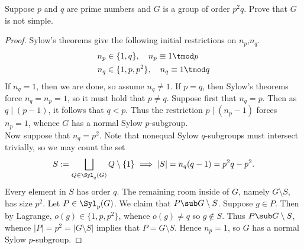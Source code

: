 \documentclass[12pt]{article}
\begin{document}
\begin{homeworkProblem}
  Suppose $p$ and $q$ are prime numbers and $G$ is a group of order $p^2q$. Prove that $G$ is not simple.

\begin{proof}
  Sylow's theorems give the following initial restrictions on $ n_{p} $,$ n_{q} $.
  \begin{align*}
      n_{p} &\in \{1,q\}, \quad n_{p} \equiv 1\tmod p\\
      n_{q} &\in \{1,p,p^{2}\},\quad n_{q} \equiv  1\tmod q\\
    \end{align*}
    If $ n_{q}=1 $, then we are done, so assume $ n_{q}\neq 1 $. If $ p=q $, then Sylow's theorems force $ n_{q}=n_{p}=1 $, so it must hold that $ p\neq q $. Suppose first that $ n_{q} = p $. Then as $ q\mid(p-1) $, it follows that $ q<p $. Thus the restriction $ p\mid (n_{p}-1) $ forces $ n_{p} = 1  $, whence $ G $ has a normal Sylow $ p $-subgroup.\\

    Now suppose that $ n_{q}=p^{2} $. Note that nonequal Sylow $ q $-subgroups must intersect trivially, so we may count the set
    \[
      S := \bigsqcup_{Q\in\Syl_{q}(G)} Q\setminus\{1\} \implies |S| = n_{q}(q-1) = p^{2}q-p^{2}.
    \]
    Every element in $ S $ has order $ q $.
    The remaining room inside of $ G $, namely $ G\setminus S $, has size $ p^{2} $. Let $ P\in \Syl_{p}(G) $. We claim that $ P\sub G\setminus S $. Suppose $ g\in P $. Then by Lagrange, $ o(g) \in \{1,p,p^{2}\} $, whence $ o(g)\neq q $ so $ g\not\in S $. Thus $ P\sub G\setminus S$, whence $ |P|=p^{2}=|G\setminus S| $ implies that $ P=G\setminus S $. Hence $ n_{p}=1 $, so $ G $ has a normal Sylow $ p $-subgroup.
\end{proof}
\end{homeworkProblem}
\end{document}
